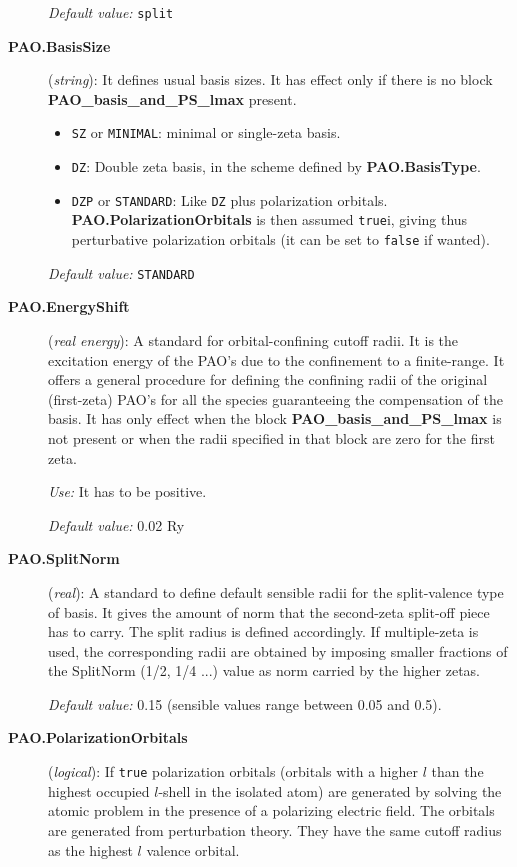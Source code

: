 \begin{description}
{\it Default value:} {\tt split}


\item[{\bf PAO.BasisSize}] ({\it string}): It defines usual
basis sizes. It has effect only if there is no 
block {\bf PAO\_basis\_and\_PS\_lmax} present.
\begin{itemize}
\item {\tt SZ} or {\tt MINIMAL}: minimal or single-zeta basis.
\item {\tt DZ}: Double zeta basis, in the scheme defined by 
{\bf PAO.BasisType}.
\item {\tt DZP} or {\tt STANDARD}: Like {\tt DZ} plus
polarization orbitals. {\bf PAO.PolarizationOrbitals} is then 
assumed {\tt true}i, giving thus perturbative polarization orbitals
(it can be set to {\tt false} if wanted).
\end{itemize}

{\it Default value:} {\tt STANDARD}



\item[{\bf PAO.EnergyShift}] ({\it real energy}): A standard for 
orbital-confining cutoff radii. It is the excitation energy
of the PAO's due to the confinement to a finite-range. It offers a
general procedure for defining the confining radii of the original
(first-zeta) PAO's for all the species guaranteeing the compensation 
of the basis. It has only effect when the block
{\bf PAO\_basis\_and\_PS\_lmax} is not present or when the radii
specified in that block are zero for the first zeta.

{\it Use:} It has to be positive.

{\it Default value:} 0.02 Ry


\item[{\bf PAO.SplitNorm}] ({\it real}): A standard to define default sensible
radii for the split-valence type of basis. It gives the amount of norm that
the second-zeta split-off piece has to carry. The split radius is defined
accordingly. If multiple-zeta is used, the corresponding radii are obtained
by imposing smaller fractions of the SplitNorm (1/2, 1/4 ...) value as
norm carried by the higher zetas.

{\it Default value:} 0.15 (sensible values range between 0.05 and 0.5).


\item[{\bf PAO.PolarizationOrbitals}] ({\it logical}): If {\tt true} 
polarization orbitals (orbitals with a higher $l$ than the highest 
occupied $l$-shell in the isolated atom)
are generated by solving the atomic problem in the presence of a 
polarizing electric field. The orbitals are generated from perturbation
theory. They have the same cutoff radius as the highest $l$ valence
orbital.


\end{description}
